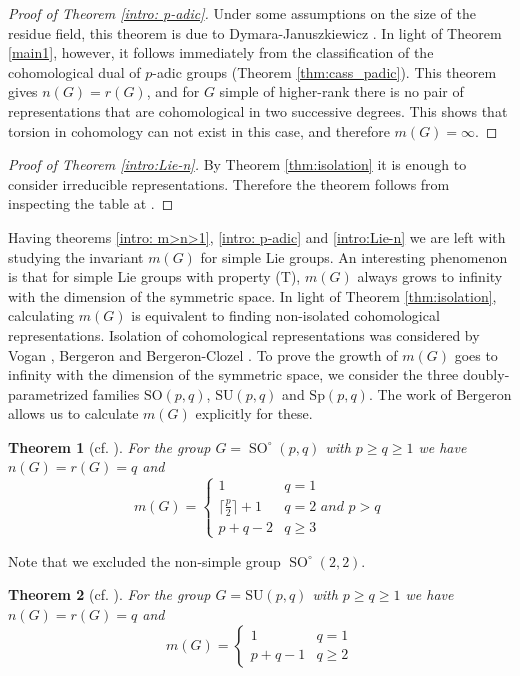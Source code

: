 \documentclass[12pt,reqno]{amsart}
\newtheorem{theorem}{Theorem}[section]
\theoremstyle{definition}
\newcommand{\SO}{\operatorname{SO}}
\begin{document}
\begin{proof}[Proof of Theorem \ref{intro: p-adic}]
    Under some assumptions on the size of the residue field, this theorem is due to Dymara-Januszkiewicz \cite{Dymara-Januszkiewicz}. In light of Theorem \ref{main1}, however, it follows immediately from the classification of the cohomological dual of $p$-adic groups (Theorem \ref{thm:cass_padic}). This theorem gives $n(G)=r(G)$, and for $G$ simple of higher-rank there is no pair of representations that are cohomological in two successive degrees. This shows that torsion in cohomology can not exist in this case, and therefore $m(G)=\infty$. 
\end{proof}
\begin{proof}[Proof of Theorem \ref{intro:Lie-n}]
    By Theorem \ref{thm:isolation} it is enough to consider irreducible representations. Therefore the theorem follows from inspecting the table at \cite[Theorem B and Appendix A]{BaderSauer}.
\end{proof}
Having theorems \ref{intro: m>n>1}, \ref{intro: p-adic} and \ref{intro:Lie-n} we are left with studying the invariant $m(G)$ for simple Lie groups. An interesting phenomenon is that for simple Lie groups with property (T), $m(G)$ always grows to infinity with the dimension of the symmetric space. In light of Theorem \ref{thm:isolation}, calculating $m(G)$ is equivalent to finding non-isolated cohomological representations. Isolation of cohomological representations was considered by Vogan \cite{voganIsol}, Bergeron \cite{BergeronIsolation, BergeronLefschetz} and Bergeron-Clozel \cite[Section~5.4]{BergeronClozel}. To prove the growth of $m(G)$ goes to infinity with the dimension of the symmetric space, we consider the three doubly-parametrized families $\mathrm{SO}(p,q)$, $\mathrm{SU}(p,q)$ and $\mathrm{Sp}(p,q)$. The work of Bergeron allows us to calculate $m(G)$ explicitly for these.
\begin{theorem}[cf. {\cite[Corollary~4.3]{BergeronLefschetz}}]\label{thm:so(p,q)}
    For the group $G=\SO^\circ(p,q)$ with $p\geq q \geq 1$ we have $n(G)=r(G)=q$ and
    \[ m(G)= \begin{cases}
1 & q=1 \\
\lceil \frac{p}{2} \rceil+1 & q=2 \textit{ and }p>q \\
 p+q -2 & q \geq 3
\end{cases}\]
\end{theorem}
Note that we excluded the non-simple group $\SO^\circ(2,2)$.
\begin{theorem}[cf. {\cite[Corollary~5.4.2]{BergeronClozel}}]\label{thm:su(p,q)}
    For the group $G=\mathrm{SU}(p,q)$ with $p\geq q \geq 1$ we have $n(G)=r(G)=q$ and
    \[ m(G)= \begin{cases}
1 & q=1 \\
 p+q -1 & q \geq 2
\end{cases}\]
\end{theorem}
\end{document}
